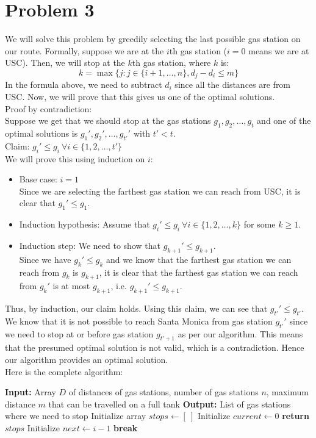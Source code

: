 \documentclass{article}
\begin{document}
\section{Problem 3}
  We will solve this problem by greedily selecting the last possible gas station on our route.
  Formally, suppose we are at the $i$th gas station ($i = 0$ means we are at USC).
  Then, we will stop at the $k$th gas station, where $k$ is:
  \[ k = \max\{j: j \in \{i+1, \dots, n\}, d_j - d_i \leq m\} \]
  In the formula above, we need to subtract $d_i$ since all the distances are from USC.
  Now, we will prove that this gives us one of the optimal solutions. \\
  Proof by contradiction: \\
  Suppose we get that we should stop at the gas stations $g_1, g_2, \dots, g_t$ and one of the optimal solutions is $g_1', g_2', \dots, g_{t'}'$ with $t' < t$. \\
  Claim: $g_i' \leq g_i ~ \forall i \in \{1, 2, \dots, t'\}$ \\
  We will prove this using induction on $i$:
  \begin{itemize}
    \item Base case: $i = 1$ \\
      Since we are selecting the farthest gas station we can reach from USC, it is clear that $g_1' \leq g_1$.
    \item Induction hypothesis: Assume that $g_i' \leq g_i ~ \forall i \in \{1, 2, \dots, k\}$ for some $k \geq 1$.
    \item Induction step: We need to show that $g_{k+1}' \leq g_{k+1}$. \\
      Since we have $g_k' \leq g_k$ and we know that the farthest gas station we can reach from $g_k$ is $g_{k+1}$, it is clear that the farthest gas station we can reach from $g_k'$ is at most $g_{k+1}$, i.e. $g_{k+1}' \leq g_{k+1}$.
  \end{itemize}
  Thus, by induction, our claim holds.
  Using this claim, we can see that $g_{t'}' \leq g_{t'}$.
  We know that it is not possible to reach Santa Monica from gas station $g_{t'}'$ since we need to stop at or before gas station $g_{t'+1}$ as per our algorithm.
  This means that the presumed optimal solution is not valid, which is a contradiction.
  Hence our algorithm provides an optimal solution. \\
  Here is the complete algorithm:
  \begin{algorithm}[H]
    \caption{Minimum Gas Stops}
    \begin{algorithmic}[1]
      \State \textbf{Input:} Array $D$ of distances of gas stations, number of gas stations $n$, maximum distance $m$ that can be travelled on a full tank
      \State \textbf{Output:} List of gas stations where we need to stop
      \State Initialize array $stops \gets [~]$
      \State Initialize $current \gets 0$
      \State \textbf{return} $stops$
            \State Initialize $next \gets i - 1$
            \State \textbf{break}
          \EndIf
        \EndFor
      \EndWhile
    \end{algorithmic}
  \end{algorithm}
\end{document}
